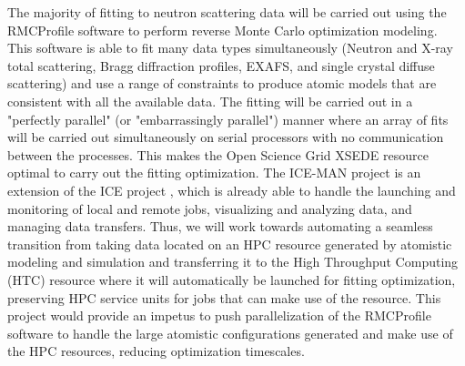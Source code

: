 The majority of fitting to neutron scattering data will be carried out using the RMCProfile \cite{Tucker2007, RMCProfileWebsite} software to perform reverse Monte Carlo optimization modeling. This software is able to fit many data types simultaneously (Neutron and X-ray total scattering, Bragg diffraction profiles, EXAFS, and single crystal diffuse scattering) and use a range of constraints to produce atomic models that are consistent with all the available data. The fitting will be carried out in a "perfectly parallel" (or "embarrassingly parallel") manner where an array of fits will be carried out simultaneously on serial processors with no communication between the processes. This makes the Open Science Grid XSEDE resource optimal to carry out the fitting optimization. The ICE-MAN project is an extension of the ICE project \cite{ICEwebsite}, which is already able to handle the launching and monitoring of local and remote jobs, visualizing and analyzing data, and managing data transfers. Thus, we will work towards automating a seamless transition from taking data located on an HPC resource generated by atomistic modeling and simulation and transferring it to the High Throughput Computing (HTC) resource where it will automatically be launched for fitting optimization, preserving HPC service units for jobs that can make use of the resource. This project would provide an impetus to push parallelization of the RMCProfile software to handle the large atomistic configurations generated and make use of the HPC resources, reducing optimization timescales.

